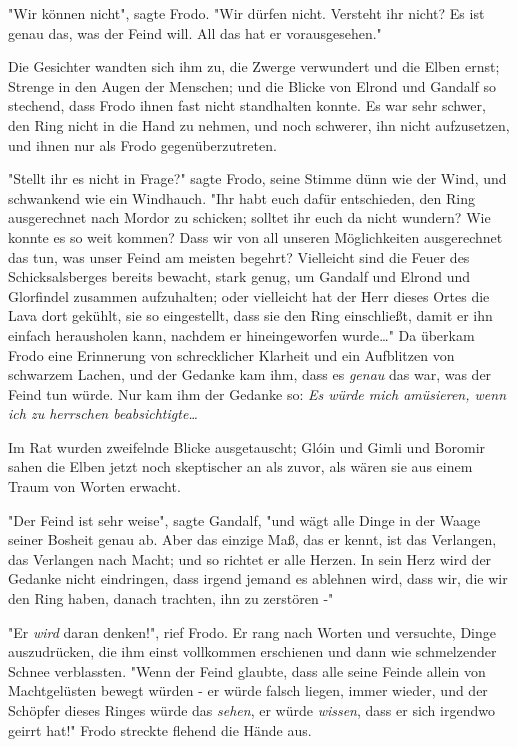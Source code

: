 {"Wir können nicht", sagte Frodo. "Wir dürfen nicht. Versteht ihr nicht? Es ist genau das, was der Feind will. All das hat er vorausgesehen."

Die Gesichter wandten sich ihm zu, die Zwerge verwundert und die Elben ernst; Strenge in den Augen der Menschen; und die Blicke von Elrond und Gandalf so stechend, dass Frodo ihnen fast nicht standhalten konnte. Es war sehr schwer, den Ring nicht in die Hand zu nehmen, und noch schwerer, ihn nicht aufzusetzen, und ihnen nur als Frodo gegenüberzutreten.

"Stellt ihr es nicht in Frage?" sagte Frodo, seine Stimme dünn wie der Wind, und schwankend wie ein Windhauch. "Ihr habt euch dafür entschieden, den Ring ausgerechnet nach Mordor zu schicken; solltet ihr euch da nicht wundern? Wie konnte es so weit kommen? Dass wir von all unseren Möglichkeiten ausgerechnet das tun, was unser Feind am meisten begehrt? Vielleicht sind die Feuer des Schicksalsberges bereits bewacht, stark genug, um Gandalf und Elrond und Glorfindel zusammen aufzuhalten; oder vielleicht hat der Herr dieses Ortes die Lava dort gekühlt, sie so eingestellt, dass sie den Ring einschließt, damit er ihn einfach herausholen kann, nachdem er hineingeworfen wurde…" Da überkam Frodo eine Erinnerung von schrecklicher Klarheit und ein Aufblitzen von schwarzem Lachen, und der Gedanke kam ihm, dass es \emph{genau} das war, was der Feind tun würde. Nur kam ihm der Gedanke so: \emph{Es würde mich amüsieren, wenn ich zu herrschen beabsichtigte…}

Im Rat wurden zweifelnde Blicke ausgetauscht; Glóin und Gimli und Boromir sahen die Elben jetzt noch skeptischer an als zuvor, als wären sie aus einem Traum von Worten erwacht.

"Der Feind ist sehr weise", sagte Gandalf, "und wägt alle Dinge in der Waage seiner Bosheit genau ab. Aber das einzige Maß, das er kennt, ist das Verlangen, das Verlangen nach Macht; und so richtet er alle Herzen. In sein Herz wird der Gedanke nicht eindringen, dass irgend jemand es ablehnen wird, dass wir, die wir den Ring haben, danach trachten, ihn zu zerstören -"

"Er \emph{wird} daran denken!", rief Frodo. Er rang nach Worten und versuchte, Dinge auszudrücken, die ihm einst vollkommen erschienen und dann wie schmelzender Schnee verblassten. "Wenn der Feind glaubte, dass alle seine Feinde allein von Machtgelüsten bewegt würden - er würde falsch liegen, immer wieder, und der Schöpfer dieses Ringes würde das \emph{sehen}, er würde \emph{wissen}, dass er sich irgendwo geirrt hat!" Frodo streckte flehend die Hände aus.

}
